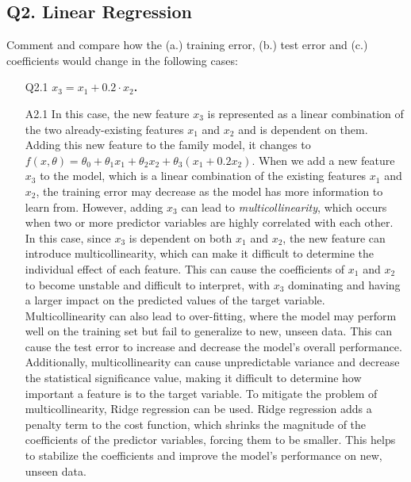 \documentclass[tikz,14pt,fleqn]{article}
\begin{document}
\subsection{Q2. Linear Regression}
Comment and compare how the (a.) training error, (b.) test error and (c.) coefficients would change in the following cases:
\begin{itemize}
\item[Q2.1] \textbf{$x_3 = x_1 + 0.2 \cdot x_2$.}
\item[A2.1] In this case, the new feature $x_3$ is represented as a linear combination of the two
already-existing features $x_1$ and $x_2$ and is dependent on them. Adding this new
feature to the family model, it changes to $f(x,\theta) = \theta_0 + \theta_1 x_1 + \theta_2 x_2 + \theta_3(x_1 + 0.2x_2)$. When we add a new feature $x_3$ to the model, which is a linear combination of the existing features $x_1$ and $x_2$, the training error may decrease as the model has more information to learn from. However, adding $x_3$ can lead to \textit{multicollinearity}, which occurs when two or more predictor variables are highly correlated with each other. In this case, since $x_3$ is dependent on both $x_1$ and $x_2$, the new feature can introduce multicollinearity, which can make it difficult to determine the individual effect of each feature. This can cause the coefficients of $x_1$ and $x_2$ to become unstable and difficult to interpret, with $x_3$ dominating and having a larger impact on the predicted values of the target variable.
Multicollinearity can also lead to over-fitting, where the model may perform well on the training set but fail to generalize to new, unseen data. This can cause the test error to increase and decrease the model's overall performance. Additionally, multicollinearity can cause unpredictable variance and decrease the statistical significance value, making it difficult to determine how important a feature is to the target variable.
To mitigate the problem of multicollinearity, Ridge regression can be used. Ridge regression adds a penalty term to the cost function, which shrinks the magnitude of the coefficients of the predictor variables, forcing them to be smaller. This helps to stabilize the coefficients and improve the model's performance on new, unseen data.


\end{itemize}
\end{document}
